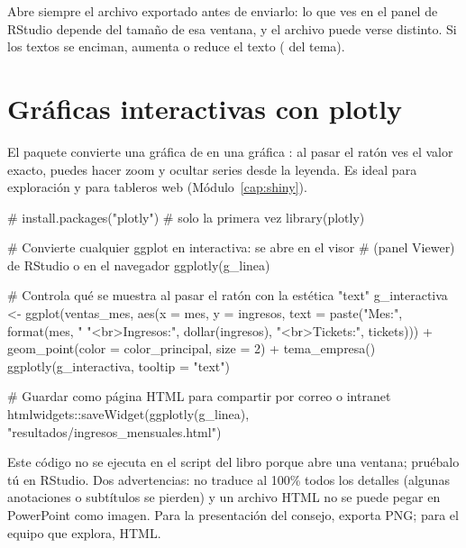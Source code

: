 \begin{consejo}
Abre siempre el archivo exportado antes de enviarlo: lo que ves en el panel
 de RStudio depende del tamaño de esa ventana, y el archivo
puede verse distinto. Si los textos se enciman, aumenta  o
reduce el texto ( del tema).
\end{consejo}

\section{Gráficas interactivas con plotly}
\label{sec:m3-plotly}

El paquete  convierte una gráfica de  en
una gráfica : al pasar el ratón ves el valor exacto,
puedes hacer zoom y ocultar series desde la leyenda. Es ideal para
exploración y para tableros web (Módulo~\ref{cap:shiny}).

\begin{rnoejecutar}
# install.packages("plotly")      # solo la primera vez
library(plotly)

# Convierte cualquier ggplot en interactiva: se abre en el visor
# (panel Viewer) de RStudio o en el navegador
ggplotly(g_linea)

# Controla qué se muestra al pasar el ratón con la estética "text"
g_interactiva <- ggplot(ventas_mes,
                        aes(x = mes, y = ingresos,
                            text = paste("Mes:", format(mes, "%
                                         "<br>Ingresos:", dollar(ingresos),
                                         "<br>Tickets:", tickets))) +
  geom_point(color = color_principal, size = 2) +
  tema_empresa()
ggplotly(g_interactiva, tooltip = "text")

# Guardar como página HTML para compartir por correo o intranet
htmlwidgets::saveWidget(ggplotly(g_linea),
                        "resultados/ingresos_mensuales.html")
\end{rnoejecutar}

Este código no se ejecuta en el script del libro porque abre una ventana;
pruébalo tú en RStudio. Dos advertencias:  no traduce al
100\% todos los detalles (algunas anotaciones o subtítulos se pierden) y un
archivo HTML no se puede pegar en PowerPoint como imagen. Para la
presentación del consejo, exporta PNG; para el equipo que explora, HTML.


